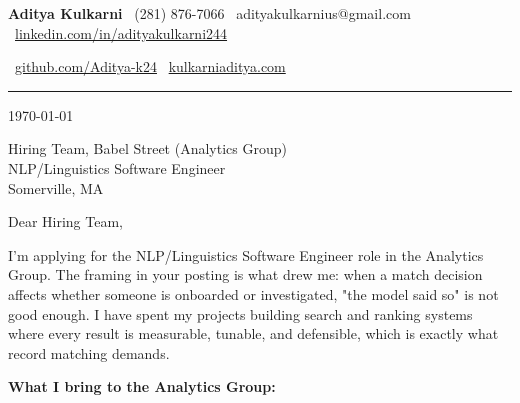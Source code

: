 \documentclass[11pt]{article}
\begin{document}
{\large\textbf{Aditya Kulkarni}} \hfill
{\small
  \textcolor{accent}{\faPhone}\ (281) 876-7066 \quad
  \textcolor{accent}{\faEnvelope}\ adityakulkarnius@gmail.com \quad
  \textcolor{accent}{\faLinkedin}\ \href{https://linkedin.com/in/adityakulkarni244}{linkedin.com/in/adityakulkarni244}
}

{\small
  \textcolor{accent}{\faGithub}\ \href{https://github.com/Aditya-k24}{github.com/Aditya-k24} \quad
  \textcolor{accent}{\faGlobe}\ \href{https://kulkarniaditya.com}{kulkarniaditya.com}
}

\vspace{4pt}
\textcolor{accent}{\rule{\linewidth}{0.5pt}}
\vspace{8pt}

\today

\vspace{8pt}
Hiring Team, Babel Street (Analytics Group)\\
NLP/Linguistics Software Engineer\\
Somerville, MA

\vspace{10pt}
Dear Hiring Team,

\vspace{8pt}
I'm applying for the NLP/Linguistics Software Engineer role in the Analytics Group. The framing in your posting is what drew me: when a match decision affects whether someone is onboarded or investigated, "the model said so" is not good enough. I have spent my projects building search and ranking systems where every result is measurable, tunable, and defensible, which is exactly what record matching demands.

\vspace{8pt}
\textbf{What I bring to the Analytics Group:}
\end{document}
